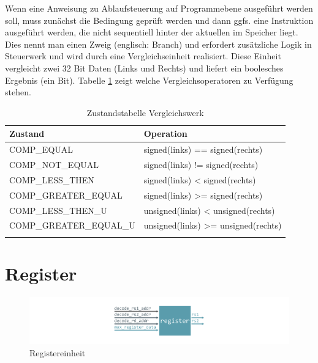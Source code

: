             Wenn eine Anweisung zu Ablaufsteuerung auf Programmebene
            ausgeführt werden soll, muss zunächst die Bedingung geprüft werden
            und dann ggfs. eine Instruktion ausgeführt werden,
            die nicht sequentiell hinter der aktuellen im Speicher liegt.
            Dies nennt man einen Zweig (englisch: Branch) und erfordert zusätzliche Logik in Steuerwerk 
            und wird durch eine Vergleichseinheit realisiert.
            Diese Einheit vergleicht zwei 32 Bit Daten (Links und Rechts) und liefert ein boolesches Ergebnis (ein Bit).
            Tabelle \ref{tab:comp-states} zeigt welche Vergleichsoperatoren zu Verfügung stehen.

            \begin{center}
                \begin{longtable}{| l | l | }
                    \hline
                        Zustand & Operation \\
                    \hline
                        COMP\_EQUAL & signed(links) == signed(rechts) \\
                    \hline
                        COMP\_NOT\_EQUAL & signed(links) != signed(rechts) \\
                    \hline
                        COMP\_LESS\_THEN & signed(links) < signed(rechts) \\
                    \hline
                        COMP\_GREATER\_EQUAL & signed(links) >= signed(rechts) \\
                    \hline
                        COMP\_LESS\_THEN\_U & unsigned(links) < unsigned(rechts) \\
                    \hline
                        COMP\_GREATER\_EQUAL\_U & unsigned(links) >= unsigned(rechts) \\
                    \hline
                    \caption[Zustandstabelle Vergleichswerk]{Zustandstabelle Vergleichswerk}
                    \label{tab:comp-states}
                \end{longtable}
            \end{center}
                


    \section{Register}

        \begin{figure}[H]
            \centering
            \includegraphics[scale=1]{img/block_register.pdf}
            \caption{Registereinheit}
            \label{fig:register}
        \end{figure}


